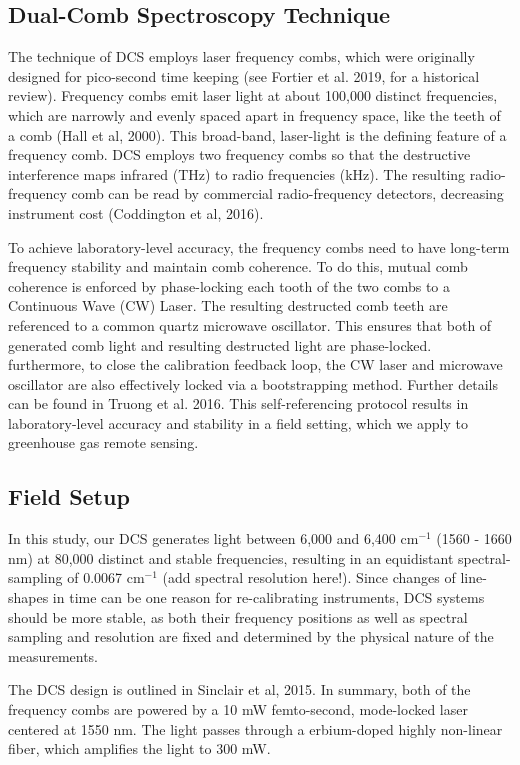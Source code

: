 \documentclass[amt, manuscript]{copernicus}
\begin{document}
\subsection{Dual-Comb Spectroscopy Technique}
The technique of DCS employs laser frequency combs, which were originally designed for pico-second time keeping (see Fortier et al. 2019, for a historical review). Frequency combs emit laser light at about 100,000 distinct frequencies, which are narrowly and evenly spaced apart in frequency space, like the teeth of a comb (Hall et al, 2000). This broad-band, laser-light is the defining feature of a frequency comb. DCS employs two frequency combs so that the destructive interference maps infrared (THz) to radio frequencies (kHz). The resulting radio-frequency comb can be read by commercial radio-frequency detectors, decreasing instrument cost (Coddington et al, 2016). 

To achieve laboratory-level accuracy, the frequency combs need to have long-term frequency stability and maintain comb coherence. To do this, mutual comb coherence is enforced by phase-locking each tooth of the two combs to a Continuous Wave (CW) Laser. The resulting destructed comb teeth are referenced to a common quartz microwave oscillator. This ensures that both of generated comb light and resulting destructed light are phase-locked. furthermore, to close the calibration feedback loop, the CW laser and microwave oscillator are also effectively locked via a bootstrapping method. Further details can be found in Truong et al. 2016. This self-referencing protocol results in laboratory-level accuracy and stability in a field setting, which we apply to greenhouse gas remote sensing. 


\subsection{Field Setup}
In this study, our DCS generates light between 6,000 and 6,400 cm$^{-1}$ (1560 - 1660 nm) at 80,000 distinct and stable frequencies, resulting in an equidistant spectral-sampling of 0.0067 cm$^{-1}$ (add spectral resolution here!). Since changes of line-shapes in time can be one reason for re-calibrating instruments, DCS systems should be more stable, as both their frequency positions as well as spectral sampling and resolution are fixed and determined by the physical nature of the measurements. 

The DCS design is outlined in  Sinclair et al, 2015. In summary, both of the frequency combs are powered by a 10 mW femto-second, mode-locked laser centered at 1550 nm. The light passes through a erbium-doped highly non-linear fiber, which amplifies the light to 300 mW. 
\end{document}
